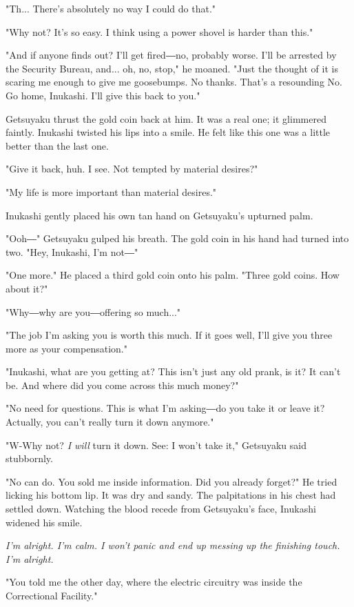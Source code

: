 "Th... There's absolutely no way I could do that."

"Why not? It's so easy. I think using a power shovel is harder than
this."

"And if anyone finds out? I'll get fired―no, probably worse. I'll be
arrested by the Security Bureau, and... oh, no, stop," he moaned. "Just
the thought of it is scaring me enough to give me goosebumps. No thanks.
That's a resounding No. Go home, Inukashi. I'll give this back to you."

Getsuyaku thrust the gold coin back at him. It was a real one; it
glimmered faintly. Inukashi twisted his lips into a smile. He felt like
this one was a little better than the last one.

"Give it back, huh. I see. Not tempted by material desires?"

"My life is more important than material desires."

Inukashi gently placed his own tan hand on Getsuyaku's upturned palm.

"Ooh―" Getsuyaku gulped his breath. The gold coin in his hand had turned
into two. "Hey, Inukashi, I'm not―"

"One more." He placed a third gold coin onto his palm. "Three gold
coins. How about it?"

"Why―why are you―offering so much..."

"The job I'm asking you is worth this much. If it goes well, I'll give
you three more as your compensation."

"Inukashi, what are you getting at? This isn't just any old prank, is
it? It can't be. And where did you come across this much money?"

"No need for questions. This is what I'm asking―do you take it or leave
it? Actually, you can't really turn it down anymore."

"W-Why not? \emph{I will} turn it down. See: I won't take it," Getsuyaku said
stubbornly.

"No can do. You sold me inside information. Did you already forget?" He
tried licking his bottom lip. It was dry and sandy. The palpitations in
his chest had settled down. Watching the blood recede from Getsuyaku's
face, Inukashi widened his smile.

\emph{I'm alright. I'm calm. I won't panic and end up messing up the finishing
	touch. I'm alright.}

"You told me the other day, where the electric circuitry was inside the
Correctional Facility."

